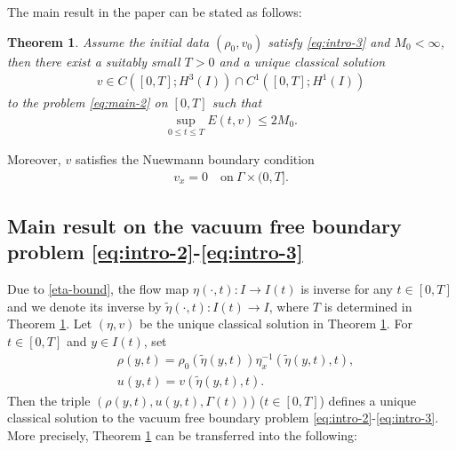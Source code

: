 \documentclass[11pt, reqno]{amsart}
\newtheorem{theorem}{Theorem}[section]
\numberwithin{equation}{section}
\begin{document}
The main result in the paper can be stated as follows:
\begin{theorem}\label{th:main-1} Assume the initial data \((\rho_0,v_0)\) satisfy \eqref{eq:intro-3} and \(M_0<\infty\), then
there exist a suitably small \(T>0\) and a unique classical solution 
\begin{align}\label{regularity}
v\in C([0,T]; H^3(I))\cap C^1([0,T]; H^1(I))
\end{align}
 to the problem \eqref{eq:main-2} on \([0,T]\) such that
\begin{align}\label{eq:inequality-1}
\sup_{0\leq t\leq T} E(t,v)\leq 2M_0.
\end{align}
\end{theorem}

Moreover, \(v\) satisfies the Nuewmann boundary condition
\begin{align}\label{Nuewmann boundary condition}
v_x=0 \quad \mbox{on}\ \Gamma\times (0,T].
\end{align}




\subsection{Main result on the vacuum free
	boundary problem \eqref{eq:intro-2}-\eqref{eq:intro-3}}

Due to \eqref{eta-bound}, the flow map \(\eta(\cdot,t)\colon I\rightarrow I(t)\) is inverse for any \(t\in[0,T]\) and we denote its inverse by \(\tilde{\eta}(\cdot,t)\colon I(t)\rightarrow I\), where \(T\) is determined in Theorem \ref{th:main-1}. Let \((\eta,v)\) be the unique classical solution in Theorem \ref{th:main-1}. For \(t\in[0,T]\) and \(y\in I(t)\), set
\begin{equation*}
\begin{aligned}
&\rho(y,t)=\rho_0(\tilde{\eta}(y,t))\eta_x^{-1}(\tilde{\eta}(y,t),t),\\
&u(y,t)=v(\tilde{\eta}(y,t),t).
\end{aligned}
\end{equation*}
Then the triple \((\rho(y,t), u(y,t), \Gamma(t))\)) (\(t\in[0,T]\)) defines a unique classical solution to the vacuum free
boundary problem \eqref{eq:intro-2}-\eqref{eq:intro-3}. More precisely, Theorem \ref{th:main-1} can be transferred into the following:
\end{document}

